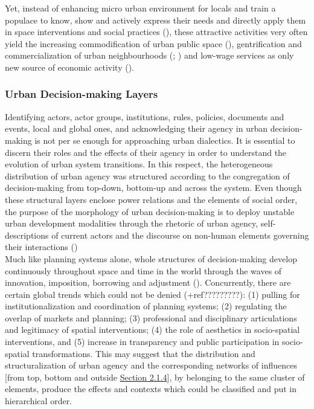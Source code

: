 \documentclass[11pt]{report}
\begin{document}
Yet, instead of enhancing micro urban environment for locals and train a populace to know, show and actively express their needs and directly apply them in space interventions and social practices
(\href{Ostrom}{\citealt{ostrom_governing_1995}}),
these attractive activities very often yield the increasing commodification of urban public space
(\href{Lehrer}{\citealt{lehrer_old_2008}}),
gentrification and commercialization of urban neighbourhoods
(\href{Zukin}{\citealt{zukin_culture_1995}}; \href{Lloyd}{\citealt{lloyd_XXX_2006}})
and low-wage services as only new source of economic activity
(\href{Basett}{\citealt{basett_XXXX_1993}}).

\subsubsection{Urban Decision-making Layers}

Identifying actors, actor groups, institutions, rules, policies, documents and events, local and global ones, and acknowledging their agency in urban decision-making is not per se enough for approaching urban dialectics.
It is essential to discern their roles and the effects of their agency in order to understand the evolution of urban system transitions.
In this respect, the heterogeneous distribution of urban agency was structured according to the congregation of decision-making from top-down, bottom-up and across the system.
Even though these structural layers enclose power relations and the elements of social order, the purpose of the morphology of urban decision-making is to deploy unstable urban development modalities 
through the rhetoric of urban agency, self-descriptions of current actors and the discourse on non-human elements governing their interactions (\href{Van}{\citealt{van_assche_co-evolutions_2013}})
\\

Much like planning systems alone, whole structures of decision-making develop continuously throughout space and time in the world through the waves of innovation,  imposition,  borrowing  and  adjustment
(\href{Nedovic}{\citealt{nedovicbudic_waves_2006}}).
Concurrently, there are certain global trends which could not be denied
(\href{Van}{\citealt{van_assche_co-evolutions_2013}}+ref?????????):
(1) pulling for institutionalization and coordination of planning systems;
(2) regulating the overlap of markets and planning;
(3) professional and disciplinary articulations and legitimacy of spatial interventions;
(4) the role of aesthetics in socio-spatial interventions, and
(5) increase in transparency and public participation in socio-spatial transformations.
This may suggest that the distribution and structuralization of urban agency and the corresponding networks of influences [from top, bottom and outside
\href{Section 2.1.4}{Section 2.1.4}], by belonging to the same cluster of elements, produce the effects and contexts which could be classified and put in hierarchical order. 
\\
\end{document}
